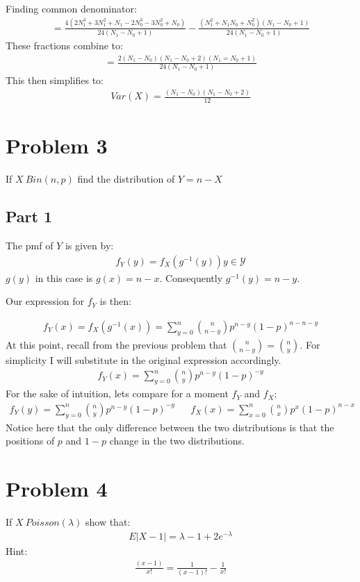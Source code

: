 \documentclass{article}
\begin{document}
Finding common denominator:
\begin{align*}
=\frac{4 (2N_1^3+3N_1^2+N_1 - 2N_0^3-3N_0^2+N_0)}{24(N_1-N_0+1)} - \frac{(N_1^2+ N_1 N_0 + N_0^2) (N_1-N_0+1)}{24(N_1-N_0+1)}
\end{align*}
These fractions combine to:
\begin{align*}
=\frac{2(N_1-N_0)(N_1-N_0+2)(N_1=N_0+1)}{24(N_1-N_0+1)}
\end{align*}
This then simplifies to:
\begin{align*}
\boxed{ Var(X)=\frac{(N_1-N_0)(N_1-N_0+2)}{12} }
\end{align*}
\clearpage

\section*{Problem 3}
If $X~Bin(n,p)$ find the distribution of $Y=n-X$
\subsection*{Part 1}
The pmf of $Y$ is given by:
\begin{align*}
f_Y(y) = f_X(g^{-1}(y)) y\in \mathcal{Y}
\end{align*}
$g(y)$ in this case is $g(x)=n-x$. Consequently $g^{-1}(y)=n-y$.

Our expression for $f_Y$ is then:

\begin{align*}
f_Y(x) = f_X(g^{-1}(x)) = \sum_{y=0}^{n} \binom{n}{n-y}p^{n-y}(1-p)^{n-n-y}
\end{align*}
At this point, recall from the previous problem that $\binom{n}{n-y}=\binom{n}{y}$. For simplicity I will substitute in the original expression accordingly.
\begin{align*}
\boxed{ f_Y(x) = \sum_{y=0}^{n} \binom{n}{y}p^{n-y}(1-p)^{-y} }
\end{align*}
For the sake of intuition, lets compare for a moment $f_Y$ and $f_X$:
\begin{align*}
f_Y(y) = \sum_{y=0}^{n} \binom{n}{y}p^{n-y}(1-p)^{-y} && f_X(x) = \sum_{x=0}^{n} \binom{n}{x}p^{x}(1-p)^{n-x}
\end{align*}
Notice here that the only difference between the two distributions is that the positions of $p$ and $1-p$ change in the two distributions.

\clearpage

\section*{Problem 4}
If $X~Poisson(\lambda)$ show that:
\begin{align*}
E|X-1|=\lambda - 1+2e^{-\lambda}
\end{align*}
Hint:
\begin{align*}
\frac{(x-1)}{x!} = \frac{1}{(x-1)!} - \frac{1}{x!}
\end{align*}
\end{document}
